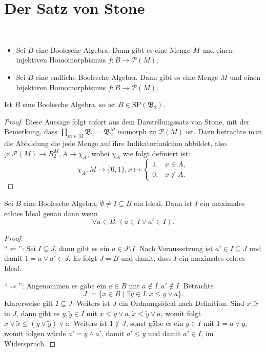 \section{Der Satz von Stone}

\begin{theorem}{\ }
    \begin{itemize}
        \item Sei $B$ eine Boolesche Algebra. Dann gibt es eine Menge $M$ und einen injektiven Homomorphismus $f : B \to \mathcal{P}(M)$.
        \item Sei $B$ eine endliche Boolesche Algebra. Dann gibt es eine Menge $M$ und einen bijektiven Homomorphismus $f : B \to \mathcal{P}(M)$.
    \end{itemize}
\end{theorem}

\begin{corollary}
    Ist $B$ eine Boolesche Algebra, so ist $B \in \mathrm{SP}(\mathfrak{B}_2)$.
\end{corollary}

\begin{proof}
    Diese Aussage folgt sofort aus dem Darstellungssatz von Stone, mit der Bemerkung, dass $\prod_{m\in M}\mathfrak{B}_2=\mathfrak{B}_2^M$ isomorph zu $\mathcal{P}(M)$ ist. Dazu betrachte man die Abbildung die jede Menge auf ihre Indikatorfunktion abbildet, also $\varphi:\mathcal{P}(M)\to B_2^M, A\mapsto \chi_A$, wobei $\chi_A$ wie folgt definiert ist:$$\chi_A:M\to\{0,1\}, x\mapsto\begin{cases}
        1, & x\in A,\\ 0,& x \not\in A.
    \end{cases}$$
\end{proof}

\begin{lemma}
    Sei $B$ eine Boolesche Algebra, $\emptyset \neq I \subsetneq B$ ein Ideal. Dann ist $I$ ein maximales echtes Ideal genau dann wenn
    $$ \forall a \in B : (a \in I \lor a' \in I). $$
\end{lemma}

\begin{proof}{\ } \\
    ``$\Leftarrow$'': Sei $I \subsetneq J$, dann gibt es ein $a\in J\setminus I$. Nach Voraussetzung ist $a'\in I\subseteq J$ und damit $1=a\lor a'\in J$. Es folgt $J=B$ und damit, dass $I$ ein maximales echtes Ideal.

    ``$\Rightarrow$'': Angenommen es gäbe ein $a \in B$ mit $a \notin I, a' \notin I$. Betrachte
    $$ J := \{ x \in B \mid \exists y \in I: x \leq y \lor a \}. $$
    Klarerweise gilt $I \subseteq J$. Weiters ist $J$ ein Ordnungsideal nach Definition. Sind $x, \widetilde{x}$ in $J$, dann gibt es $y, \widetilde{y} \in I$ mit $x \leq y \lor a, \widetilde{x} \leq \widetilde{y} \lor a$, womit folgt $x \lor \widetilde{x} \leq (y \lor \widetilde{y}) \lor a$. Weiters ist $1 \notin J$, sonst gäbe es ein $y \in I$ mit $1 = a \lor y$, womit folgen würde $a' = y \land a'$, damit $a' \leq y$ und damit $a' \in I$, im Widerspruch.
\end{proof}

